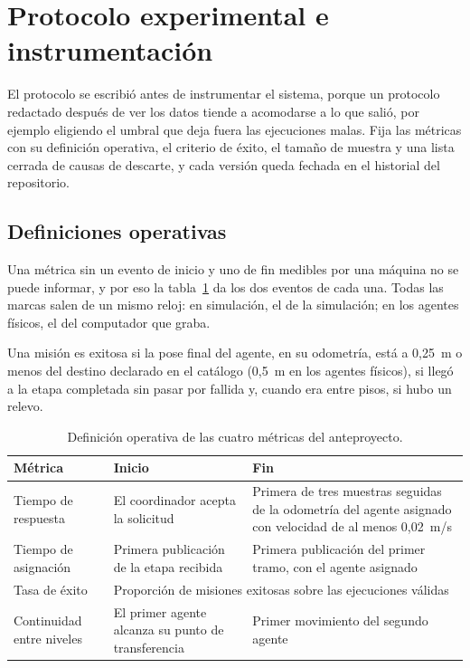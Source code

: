 \section{Protocolo experimental e instrumentación}
\label{sec:protocolo}

El protocolo se escribió antes de instrumentar el sistema, porque un protocolo redactado después de ver los datos tiende a acomodarse a lo que salió, por ejemplo eligiendo el umbral que deja fuera las ejecuciones malas. Fija
las métricas con su definición operativa, el criterio de éxito, el tamaño de muestra y una lista cerrada de causas de descarte, y cada versión queda fechada en el historial del repositorio.

\subsection{Definiciones operativas}

Una métrica sin un evento de inicio y uno de fin medibles por una máquina no se puede informar, y por eso la tabla~\ref{tab:metricas} da los dos eventos de cada una. Todas las marcas salen de un mismo reloj: en simulación, el de la
simulación; en los agentes físicos, el del computador que graba.

Una misión es exitosa si la pose final del agente, en su odometría, está a 0,25~m o menos del destino declarado en el catálogo (0,5~m en los agentes físicos), si llegó a la etapa completada sin pasar por fallida y, cuando era entre
pisos, si hubo un relevo.

\begin{table}[H]
  \centering\small
  \caption{Definición operativa de las cuatro métricas del anteproyecto.}
  \label{tab:metricas}
  \begin{tabular}{@{}p{}p{}p{}@{}}
    \toprule
    \textbf{Métrica} & \textbf{Inicio} & \textbf{Fin} \\ \midrule
    Tiempo de respuesta & El coordinador acepta la solicitud & Primera de tres muestras seguidas de la odometría del agente asignado con velocidad de al menos 0,02~m/s \\ \addlinespace
    Tiempo de asignación & Primera publicación de la etapa recibida & Primera publicación del primer tramo, con el agente asignado \\ \addlinespace
    Tasa de éxito & \multicolumn{2}{p{0.72\textwidth}}{Proporción de misiones exitosas sobre las ejecuciones válidas} \\ \addlinespace
    Continuidad entre niveles & El primer agente alcanza su punto de transferencia & Primer movimiento del segundo agente \\ \bottomrule
  \end{tabular}
\end{table}

